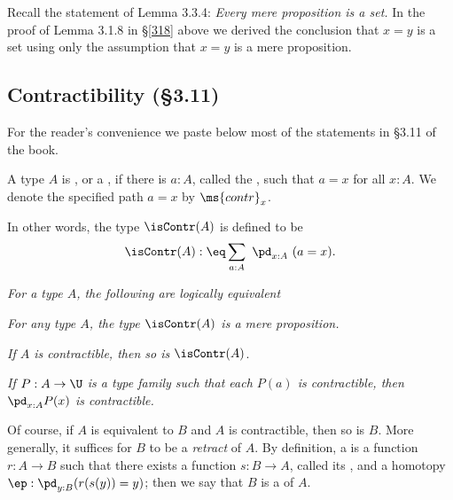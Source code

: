 \documentclass[12pt]{article}
\begin{document}
Recall the statement of Lemma 3.3.4: \emph{Every mere proposition is a set.} In the proof of Lemma 3.1.8 in \S\ref{318} above we derived the conclusion that $x=y$ is a set using only the assumption that $x=y$ is a mere proposition.


\subsection{Contractibility (\S3.11)}\label{311}


For the reader's convenience we paste below most of the statements in \S3.11 of the book.

\nn{} A type $A$ is , or a , if there is $a:A$, called the , such that $a=x$ for all $x:A$. We denote the specified path $a=x$ by $\ms{contr}_x$.

In other words, the type $\isContr(A)$ is defined to be
$$
\isContr(A):\eq\sum_{a:A}\ \pd_{x:A}\ (a=x).
$$

\nn{} \emph{For a type $A$, the following are logically equivalent}

\nn{} \emph{For any type $A$, the type $\isContr(A)$ is a mere proposition.}

\nn{} \emph{If $A$ is contractible, then so is} $\isContr(A)$.

\nn{} \emph{If $P:A\to\U$ is a type family such that each $P(a)$ is contractible, then $\pd_{x:A}P(x)$ is contractible.}

Of course, if $A$ is equivalent to $B$ and $A$ is contractible, then so is $B$. More generally, it suffices for $B$ to be a \emph{retract} of $A$. By definition, a  is a function $r:A\to B$ such that there exists a function $s:B\to A$, called its , and a homotopy $\ep:\pd_{y:B}(r(s(y))=y)$; then we say that $B$ is a  of $A$.
\end{document}
